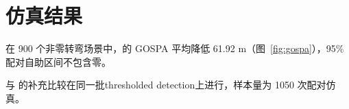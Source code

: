 \section{仿真结果}
在 900 个非零转弯场景中，\method 的 GOSPA 平均降低 61.92 m（图~\ref{fig:gospa}），95\% 配对自助区间不包含零。

与 \gtmethod 的补充比较在同一批thresholded detection上进行，样本量为 1050 次配对仿真。
